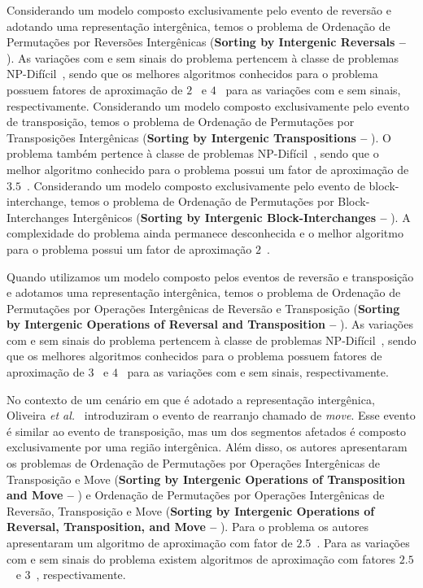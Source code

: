 Considerando um modelo composto exclusivamente pelo evento de reversão e adotando uma representação intergênica, temos o problema de Ordenação de Permutações por Reversões Intergênicas (\textbf{Sorting by Intergenic Reversals --} \SbIR). As variações com e sem sinais do problema pertencem à classe de problemas NP-Difícil~\cite{2021b-oliveira-etal,2020a-brito-etal}, sendo que os melhores algoritmos conhecidos para o problema possuem fatores de aproximação de $2$~\cite{2021b-oliveira-etal} e $4$~\cite{2020a-brito-etal} para as variações com e sem sinais, respectivamente. Considerando um modelo composto exclusivamente pelo evento de transposição, temos o problema de Ordenação de Permutações por Transposições Intergênicas (\textbf{Sorting by Intergenic Transpositions --} \SbIT). O problema também pertence à classe de problemas NP-Difícil~\cite{2021a-oliveira-etal}, sendo que o melhor algoritmo conhecido para o problema possui um fator de aproximação de $3.5$~\cite{2021a-oliveira-etal}. Considerando um modelo composto exclusivamente pelo evento de block-interchange, temos o problema de Ordenação de Permutações por Block-Interchanges Intergênicos (\textbf{Sorting by Intergenic Block-Interchanges --} \SbIBI). A complexidade do problema ainda permanece desconhecida e o melhor algoritmo para o problema possui um fator de aproximação $2$~\cite{2019-dias-etal}.

Quando utilizamos um modelo composto pelos eventos de reversão e transposição e adotamos uma representação intergênica, temos o problema de Ordenação de Permutações por Operações Intergênicas de Reversão e Transposição (\textbf{Sorting by Intergenic Operations of Reversal and Transposition --} \SbIRT). As variações com e sem sinais do problema pertencem à classe de problemas NP-Difícil~\cite{2021a-oliveira-etal,2020a-brito-etal}, sendo que os melhores algoritmos conhecidos para o problema possuem fatores de aproximação de $3$~\cite{2021a-oliveira-etal} e $4$~\cite{2021b-brito-etal} para as variações com e sem sinais, respectivamente.

No contexto de um cenário em que é adotado a representação intergênica, Oliveira \textit{et al.}~\cite{2021a-oliveira-etal} introduziram o evento de rearranjo chamado de \emph{move}. Esse evento é similar ao evento de transposição, mas um dos segmentos afetados é composto exclusivamente por uma região intergênica. Além disso, os autores apresentaram os problemas de Ordenação de Permutações por Operações Intergênicas de Transposição e Move (\textbf{Sorting by Intergenic Operations of Transposition and Move --} \SbITM) e Ordenação de Permutações por Operações Intergênicas de Reversão, Transposição e Move (\textbf{Sorting by Intergenic Operations of Reversal, Transposition, and Move --} \SbIRTM). Para o problema \SbITM{} os autores apresentaram um algoritmo de aproximação com fator de $2.5$~\cite{2021a-oliveira-etal}. Para as variações com e sem sinais do problema \SbIRTM{} existem algoritmos de aproximação com fatores $2.5$~\cite{2021a-oliveira-etal} e $3$~\cite{2021b-brito-etal}, respectivamente.  

